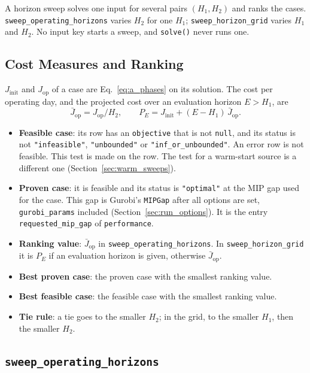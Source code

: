 A horizon sweep solves one input for several pairs $(H_1, H_2)$ and ranks the cases. \texttt{sweep\_operating\_horizons} varies $H_2$ for one $H_1$; \texttt{sweep\_horizon\_grid} varies $H_1$ and $H_2$.
No input key starts a sweep, and \texttt{solve()} never runs one.

\subsection{Cost Measures and Ranking}
\label{sec:sweep_criteria}

$J_{\mathrm{init}}$ and $J_{\mathrm{op}}$ of a case are Eq.~\eqref{eq:a_phases} on its solution. The cost per operating day, and the projected cost over an evaluation horizon $E > H_1$, are
\begin{equation}
  \bar J_{\mathrm{op}} = J_{\mathrm{op}} / H_2, \qquad
  P_E = J_{\mathrm{init}} + (E - H_1)\,\bar J_{\mathrm{op}} .
  \label{eq:d_projected}
\end{equation}
\begin{itemize}[nosep,leftmargin=1.5em]
  \item \textbf{Feasible case}: its row has an \texttt{objective} that is not \texttt{null}, and its status is not \texttt{"infeasible"}, \texttt{"unbounded"} or \texttt{"inf\_or\_unbounded"}. An error row is not feasible. This test is made on the row. The test for a warm-start source is a different one (Section~\ref{sec:warm_sweeps}).
  \item \textbf{Proven case}: it is feasible and its status is \texttt{"optimal"} at the MIP gap used for the case. This gap is Gurobi's \texttt{MIPGap} after all options are set, \texttt{gurobi\_params} included (Section~\ref{sec:run_options}). It is the entry \texttt{requested\_mip\_gap} of \texttt{performance}.
  \item \textbf{Ranking value}: $\bar J_{\mathrm{op}}$ in \texttt{sweep\_operating\_horizons}. In \texttt{sweep\_horizon\_grid} it is $P_E$ if an evaluation horizon is given, otherwise $\bar J_{\mathrm{op}}$.
  \item \textbf{Best proven case}: the proven case with the smallest ranking value.
  \item \textbf{Best feasible case}: the feasible case with the smallest ranking value.
  \item \textbf{Tie rule}: a tie goes to the smaller $H_2$; in the grid, to the smaller $H_1$, then the smaller $H_2$.
\end{itemize}

\subsection{\texttt{sweep\_operating\_horizons}}
\label{sec:sweep_operating}

